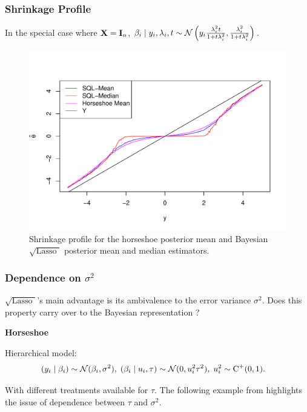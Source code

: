 \documentclass[10pt]{beamer}
\theoremstyle{plain}
\def\heading#1{\begin{center} \Large\bf{\color{DarkBlue} #1}
\end{center} } %
\def\sql{$\sqrt{\text{Lasso }}$}
\begin{document}
\begin{frame}
	\frametitle{Shrinkage Profile}
	In the special case where ${\bf X} = {\bf I}_n$, $ \beta_i \mid y_i, \lambda_i, t \sim \mathcal{N} \left(y_i \frac{\lambda_i^2 t}{1 + t \lambda_i^2}, \frac{\lambda_i^2}{1 + t \lambda_i^2} \right) $.
	\begin{figure}
	\centering
\includegraphics[width=0.7\columnwidth]{art/shrinkage_profile}%
\caption{Shrinkage profile for the horseshoe posterior mean and Bayesian \sql{} posterior mean and median estimators. }%
\label{fig:profile}%
	\end{figure}
\end{frame}

\begin{frame}
	\frametitle{Dependence on $\sigma^2$}
	\sql's main advantage is its ambivalence to the error variance $\sigma^2$. Does this property carry over to the Bayesian representation ?
	\heading{Horseshoe}
	Hierarchical model: 
\begin{align}
  (y_i \mid \beta_i) & \sim \mathcal{N}(\beta_i , \sigma^2), \;  (\beta_i \mid u_i, \tau) \sim 
  \mathcal{N}(0, u_i^2 \tau^2), \; u_i ^2 \sim \operatorname{C}^{+}(0,1).
  \label{eq:hs}
\end{align}

With different treatments available for $\tau.$ The following example from \cite{polson2010shrink} highlights the issue of dependence between $\tau$ and $\sigma^2$. 
\end{frame}
\end{document}
